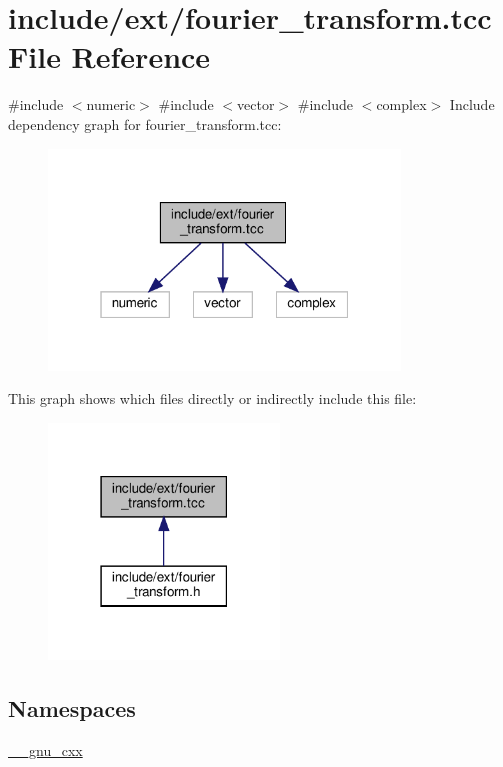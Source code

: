 \hypertarget{fourier__transform_8tcc}{}\section{include/ext/fourier\+\_\+transform.tcc File Reference}
\label{fourier__transform_8tcc}
{\ttfamily \#include $<$numeric$>$}\newline
{\ttfamily \#include $<$vector$>$}\newline
{\ttfamily \#include $<$complex$>$}\newline
Include dependency graph for fourier\+\_\+transform.\+tcc\+:
\nopagebreak
\begin{figure}[H]
\begin{center}
\leavevmode
\includegraphics[width=265pt]{fourier__transform_8tcc__incl}
\end{center}
\end{figure}
This graph shows which files directly or indirectly include this file\+:
\nopagebreak
\begin{figure}[H]
\begin{center}
\leavevmode
\includegraphics[width=174pt]{fourier__transform_8tcc__dep__incl}
\end{center}
\end{figure}
\subsection*{Namespaces}
\begin{DoxyCompactItemize}
\item 
 \hyperlink{namespace____gnu__cxx}{\+\_\+\+\_\+gnu\+\_\+cxx}
\end{DoxyCompactItemize}
